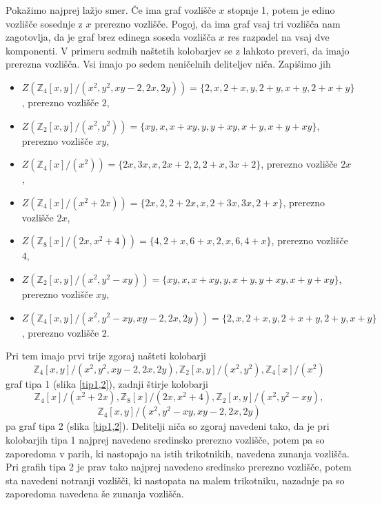 \documentclass[a4paper, 12pt]{amsart}
\theoremstyle{definition} %
\theoremstyle{plain} %
\newcommand{\Z}{\mathbb Z}
\begin{document}
\proof
Pokažimo najprej lažjo smer. Če ima graf vozlišče $x$ stopnje 1, potem je edino vozlišče sosednje z $x$ prerezno vozlišče. Pogoj, da ima graf vsaj tri vozlišča nam zagotovlja, da je graf brez edinega soseda vozlišča $x$ res razpadel na vsaj dve komponenti. 
V primeru sedmih naštetih kolobarjev se z lahkoto preveri, da imajo prerezna vozlišča. Vsi imajo po sedem neničelnih deliteljev niča. Zapišimo jih
\begin{itemize}
\item $Z(\Z_4[x,y]/(x^2,y^2,xy-2,2x,2y)) = \{2,x,2+x,y,2+y,x+y,2+x+y\}$, prerezno vozlišče $2$,
\item $Z(\Z_2[x,y]/(x^2,y^2)) = \{xy,x,x+xy,y,y+xy,x+y,x+y+xy\}$, prerezno vozlišče $xy$,
\item $Z(\Z_4[x]/(x^2)) = \{2x,3x,x,2x+2,2,2+x,3x+2\}$, prerezno vozlišče $2x$,
\item $Z(\Z_4[x]/(x^2+2x)) = \{2x,2,2+2x,x,2+3x,3x,2+x\}$, prerezno vozlišče $2x$,
\item $Z(\Z_8[x]/(2x,x^2+4)) = \{4,2+x,6+x,2,x,6,4+x\}$, prerezno vozlišče $4$,
\item $Z(\Z_2[x,y]/(x^2,y^2-xy)) = \{xy,x,x+xy,y,x+y,y+xy,x+y+xy\}$, prerezno vozlišče $xy$,
\item $Z(\Z_4[x,y]/(x^2,y^2-xy,xy-2,2x,2y)) = \{2,x,2+x,y,2+x+y,2+y,x+y\}$, prerezno vozlišče $2$.
\end{itemize} 
Pri tem imajo prvi trije zgoraj našteti kolobarji 
$$
\Z_4[x,y]/(x^2,y^2,xy-2,2x,2y), \Z_2[x,y]/(x^2,y^2), \Z_4[x]/(x^2)
$$
graf tipa 1 (slika \ref{tip1,2}), zadnji štirje kolobarji 
$$
\Z_4[x]/(x^2+2x), \Z_8[x]/(2x,x^2 + 4), \Z_2[x,y]/(x^2, y^2 - xy),
$$
$$
\Z_4[x,y]/(x^2, y^2 - xy, xy-2,2x,2y)
$$
pa graf  tipa 2 (slika \ref{tip1,2}). Delitelji niča so zgoraj navedeni tako, da je pri kolobarjih tipa 1 najprej navedeno sredinsko prerezno vozlišče, potem pa so zaporedoma v parih, ki nastopajo na istih trikotnikih, navedena zunanja vozlišča. Pri grafih tipa 2 je prav tako najprej navedeno sredinsko prerezno vozlišče, potem sta navedeni notranji vozlišči, ki nastopata na malem trikotniku, nazadnje pa so zaporedoma navedena še zunanja vozlišča.
\end{document}
